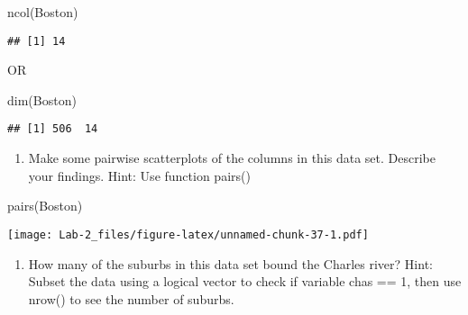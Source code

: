 \documentclass[
]{article}
\newenvironment{Shaded}{\begin{snugshade}}{\end{snugshade}}
\newcommand{\DecValTok}[1]{\textcolor[rgb]{0.00,0.00,0.81}{#1}}
\newcommand{\FunctionTok}[1]{\textcolor[rgb]{0.00,0.00,0.00}{#1}}
\newcommand{\NormalTok}[1]{#1}
\newcommand{\SpecialCharTok}[1]{\textcolor[rgb]{0.00,0.00,0.00}{#1}}
\providecommand{\tightlist}{%
  \setlength{\itemsep}{0pt}\setlength{\parskip}{0pt}}
\begin{document}
\begin{Shaded}
\begin{Highlighting}[]
\FunctionTok{ncol}\NormalTok{(Boston)}
\end{Highlighting}
\end{Shaded}

\begin{verbatim}
## [1] 14
\end{verbatim}

OR

\begin{Shaded}
\begin{Highlighting}[]
\FunctionTok{dim}\NormalTok{(Boston)}
\end{Highlighting}
\end{Shaded}

\begin{verbatim}
## [1] 506  14
\end{verbatim}

\begin{enumerate}
\def\labelenumi{\alph{enumi}.}
\setcounter{enumi}{1}
\tightlist
\item
  Make some pairwise scatterplots of the columns in this data set.
  Describe your findings. Hint: Use function pairs()
\end{enumerate}

\begin{Shaded}
\begin{Highlighting}[]
\FunctionTok{pairs}\NormalTok{(Boston)}
\end{Highlighting}
\end{Shaded}

\texttt{[image: Lab-2\_files/figure-latex/unnamed-chunk-37-1.pdf]}

\begin{enumerate}
\def\labelenumi{\alph{enumi}.}
\setcounter{enumi}{2}
\tightlist
\item
  How many of the suburbs in this data set bound the Charles river?
  Hint: Subset the data using a logical vector to check if variable chas
  == 1, then use nrow() to see the number of suburbs.
\end{enumerate}

\begin{Shaded}
\end{Shaded}
\end{document}
